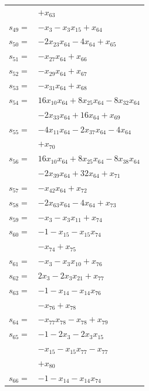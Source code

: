 \begin{longtable}{@{}r@{\;}l@{}}
 & \(\displaystyle +x_{63}\) \\[3pt]
\(s_{49}=\) & \(\displaystyle -x_{3} -x_{3}x_{15} +x_{64}\) \\[3pt]
\(s_{50}=\) & \(\displaystyle -2x_{23}x_{64} -4x_{64} +x_{65}\) \\[3pt]
\(s_{51}=\) & \(\displaystyle -x_{27}x_{64} +x_{66}\) \\[3pt]
\(s_{52}=\) & \(\displaystyle -x_{29}x_{64} +x_{67}\) \\[3pt]
\(s_{53}=\) & \(\displaystyle -x_{31}x_{64} +x_{68}\) \\[3pt]
\(s_{54}=\) & \(\displaystyle 16x_{10}x_{64} +8x_{25}x_{64} -8x_{32}x_{64}\) \\
 & \(\displaystyle -2x_{33}x_{64} +16x_{64} +x_{69}\) \\[3pt]
\(s_{55}=\) & \(\displaystyle -4x_{11}x_{64} -2x_{37}x_{64} -4x_{64}\) \\
 & \(\displaystyle +x_{70}\) \\[3pt]
\(s_{56}=\) & \(\displaystyle 16x_{10}x_{64} +8x_{25}x_{64} -8x_{38}x_{64}\) \\
 & \(\displaystyle -2x_{39}x_{64} +32x_{64} +x_{71}\) \\[3pt]
\(s_{57}=\) & \(\displaystyle -x_{42}x_{64} +x_{72}\) \\[3pt]
\(s_{58}=\) & \(\displaystyle -2x_{63}x_{64} -4x_{64} +x_{73}\) \\[3pt]
\(s_{59}=\) & \(\displaystyle -x_{3} -x_{3}x_{11} +x_{74}\) \\[3pt]
\(s_{60}=\) & \(\displaystyle -1 -x_{15} -x_{15}x_{74}\) \\
 & \(\displaystyle -x_{74} +x_{75}\) \\[3pt]
\(s_{61}=\) & \(\displaystyle -x_{3} -x_{3}x_{10} +x_{76}\) \\[3pt]
\(s_{62}=\) & \(\displaystyle 2x_{3} -2x_{3}x_{21} +x_{77}\) \\[3pt]
\(s_{63}=\) & \(\displaystyle -1 -x_{14} -x_{14}x_{76}\) \\
 & \(\displaystyle -x_{76} +x_{78}\) \\[3pt]
\(s_{64}=\) & \(\displaystyle -x_{77}x_{78} -x_{78} +x_{79}\) \\[3pt]
\(s_{65}=\) & \(\displaystyle -1 -2x_{3} -2x_{3}x_{15}\) \\
 & \(\displaystyle -x_{15} -x_{15}x_{77} -x_{77}\) \\
 & \(\displaystyle +x_{80}\) \\[3pt]
\(s_{66}=\) & \(\displaystyle -1 -x_{14} -x_{14}x_{74}\) \\

\end{longtable}
